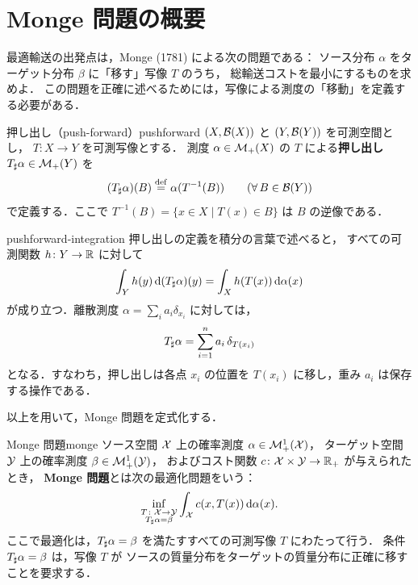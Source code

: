 \section{Monge 問題の概要}
\label{sec:monge-overview}

最適輸送の出発点は，Monge (1781) による次の問題である：
ソース分布 $\alpha$ をターゲット分布 $\beta$ に「移す」写像 $T$ のうち，
総輸送コストを最小にするものを求めよ．
この問題を正確に述べるためには，写像による測度の「移動」を定義する必要がある．

\begin{definition}{押し出し（push-forward）}{pushforward}
  $(X, \mathcal{B}(X))$ と $(Y, \mathcal{B}(Y))$ を可測空間とし，
  $T \colon X \to Y$ を可測写像とする．
  測度 $\alpha \in \mathcal{M}_+(X)$ の $T$ による\textbf{押し出し}
  $T_\sharp \alpha \in \mathcal{M}_+(Y)$ を
  \[
    (T_\sharp \alpha)(B) \overset{\mathrm{def}}{=} \alpha(T^{-1}(B))
    \qquad (\forall\, B \in \mathcal{B}(Y))
  \]
  で定義する．ここで $T^{-1}(B) = \{x \in X \mid T(x) \in B\}$ は $B$ の逆像である．
\end{definition}

\begin{remark}{}{pushforward-integration}
  押し出しの定義を積分の言葉で述べると，
  すべての可測関数 $h \colon Y \to \mathbb{R}$ に対して
  \[
    \int_Y h(y) \, \mathrm{d}(T_\sharp \alpha)(y) = \int_X h(T(x)) \, \mathrm{d}\alpha(x)
  \]
  が成り立つ．離散測度 $\alpha = \sum_i a_i \delta_{x_i}$ に対しては，
  \[
    T_\sharp \alpha = \sum_{i=1}^n a_i \, \delta_{T(x_i)}
  \]
  となる．すなわち，押し出しは各点 $x_i$ の位置を $T(x_i)$ に移し，重み $a_i$ は保存する操作である．
\end{remark}

以上を用いて，Monge 問題を定式化する．

\begin{setting}{Monge 問題}{monge}
  ソース空間 $\mathcal{X}$ 上の確率測度 $\alpha \in \mathcal{M}_+^1(\mathcal{X})$，
  ターゲット空間 $\mathcal{Y}$ 上の確率測度 $\beta \in \mathcal{M}_+^1(\mathcal{Y})$，
  およびコスト関数 $c \colon \mathcal{X} \times \mathcal{Y} \to \mathbb{R}_+$ が与えられたとき，
  \textbf{Monge 問題}とは次の最適化問題をいう：
  \[
    \inf_{\substack{T \colon \mathcal{X} \to \mathcal{Y} \\ T_\sharp \alpha = \beta}}
    \int_{\mathcal{X}} c(x, T(x)) \, \mathrm{d}\alpha(x).
  \]
  ここで最適化は，$T_\sharp \alpha = \beta$ を満たすすべての可測写像 $T$ にわたって行う．
  条件 $T_\sharp \alpha = \beta$ は，写像 $T$ が
  ソースの質量分布をターゲットの質量分布に正確に移すことを要求する．
\end{setting}

